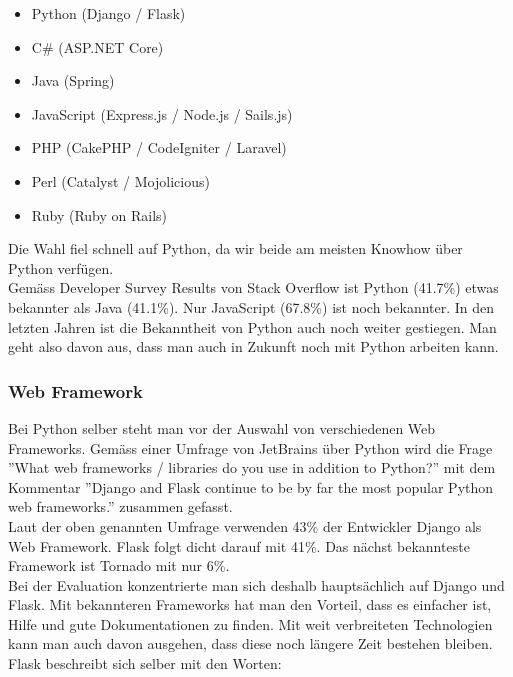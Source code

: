 
\begin{itemize}
	\item Python (Django / Flask)
	\item C\# (ASP.NET Core)
	\item Java (Spring)
	\item JavaScript (Express.js / Node.js / Sails.js)
	\item PHP (CakePHP / CodeIgniter / Laravel)
	\item Perl (Catalyst / Mojolicious)
	\item Ruby (Ruby on Rails)
\end{itemize}


Die Wahl fiel schnell auf Python, da wir beide am meisten Knowhow über Python verfügen. \\
Gemäss Developer Survey Results von Stack Overflow ist Python (41.7\%) etwas bekannter als Java (41.1\%). Nur JavaScript (67.8\%) ist noch bekannter. In den letzten Jahren ist die Bekanntheit von Python auch noch weiter gestiegen. Man geht also davon aus, dass man auch in Zukunft noch mit Python arbeiten kann.


\subsubsection*{Web Framework}
Bei Python selber steht man vor der Auswahl von verschiedenen Web Frameworks. Gemäss einer Umfrage von JetBrains über Python wird die Frage ''What web frameworks / libraries do you use in addition to Python?'' mit dem Kommentar ''Django and Flask continue to be by far the most popular Python web frameworks.'' zusammen gefasst. \\
Laut der oben genannten Umfrage verwenden 43\% der Entwickler  Django als Web Framework. Flask folgt dicht darauf mit 41\%. Das nächst bekannteste Framework ist Tornado mit nur 6\%. \\
Bei der Evaluation konzentrierte man sich deshalb hauptsächlich auf Django und Flask. Mit bekannteren Frameworks hat man den Vorteil, dass es einfacher ist, Hilfe und gute Dokumentationen zu finden. Mit weit verbreiteten Technologien kann man auch davon ausgehen, dass diese noch längere Zeit bestehen bleiben.  \\ 

Flask beschreibt sich selber mit den Worten:

